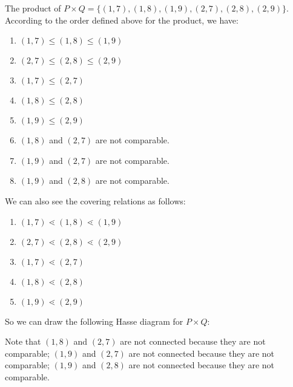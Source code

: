 \documentclass[12pt, letterpaper, oneside]{book}
\begin{document}
The product of $P \times Q = \{(1, 7), (1, 8), (1, 9), (2, 7), (2, 8), (2, 9)\}$. According to the order defined above
for the product, we have:
\begin{enumerate}
  \item $(1, 7) \leqslant (1, 8) \leqslant (1, 9)$
  \item $(2, 7) \leqslant (2, 8) \leqslant (2, 9)$
  \item $(1, 7) \leqslant (2, 7)$
  \item $(1, 8) \leqslant (2, 8)$
  \item $(1, 9) \leqslant (2, 9)$
  \item $(1, 8)$ and $(2, 7)$ are not comparable.
  \item $(1, 9)$ and $(2, 7)$ are not comparable.
  \item $(1, 9)$ and $(2, 8)$ are not comparable.
\end{enumerate}

We can also see the covering relations as follows:
\begin{enumerate}
  \item $(1, 7) \lessdot (1, 8) \lessdot (1, 9)$
  \item $(2, 7) \lessdot (2, 8) \lessdot (2, 9)$
  \item $(1, 7) \lessdot (2, 7)$
  \item $(1, 8) \lessdot (2, 8)$
  \item $(1, 9) \lessdot (2, 9)$
\end{enumerate}

So we can draw the following Hasse diagram for $P \times Q$:


Note that $(1, 8)$ and $(2, 7)$ are not connected because they are not comparable; $(1, 9)$ and $(2, 7)$ are not
connected because they are not comparable; $(1, 9)$ and $(2, 8)$ are not connected because they are not comparable.
\end{document}
